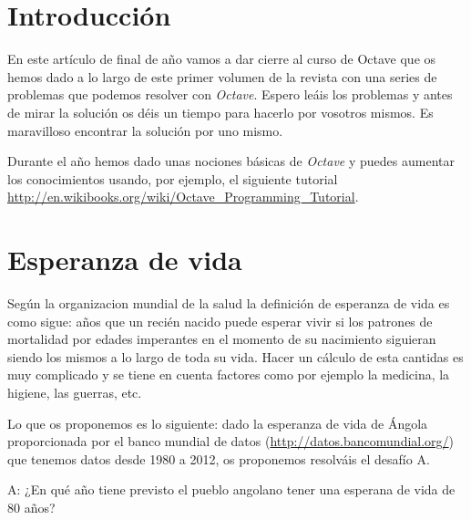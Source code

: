 \section*{Introducción}

En este artículo de final de año vamos a dar cierre al curso de Octave
que os hemos dado a lo largo de este primer volumen de la revista con
una series de problemas que podemos resolver con \emph{Octave}. Espero
leáis los problemas y antes de mirar la solución os déis un tiempo
para hacerlo por vosotros mismos. Es maravilloso encontrar la solución
por uno mismo.

Durante el año hemos dado unas nociones básicas de \emph{Octave} y
puedes aumentar los conocimientos usando, por ejemplo, el siguiente
tutorial
\url{http://en.wikibooks.org/wiki/Octave_Programming_Tutorial}.

\section{Esperanza de vida}
 
Según la organizacion mundial de la salud la definición de esperanza
de vida es como sigue: años que un recién nacido puede esperar vivir
si los patrones de mortalidad por edades imperantes en el momento de
su nacimiento siguieran siendo los mismos a lo largo de toda su
vida. Hacer un cálculo de esta cantidas es muy complicado y se tiene
en cuenta factores como por ejemplo la medicina, la higiene, las
guerras, etc.

Lo que os proponemos es lo siguiente: dado la esperanza de vida de
Ángola proporcionada por el banco mundial de datos
(\url{http://datos.bancomundial.org/}) que tenemos datos desde 1980 a
2012, os proponemos resolváis el desafío A.

\begin{mybox}
  \cappar A: ¿En qué año tiene previsto el pueblo angolano tener una
  esperana de vida de 80 años?\vspace{1.5cm}
\end{mybox}



